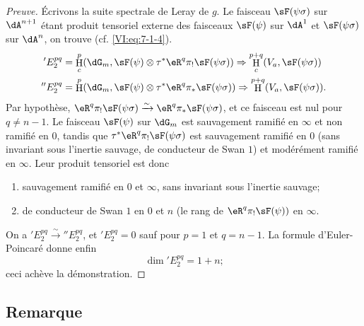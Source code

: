 \documentclass[oneside]{book}
\DeclareMathOperator{\h}{H}
\newcommand{\iso}{\xrightarrow\sim}
\theoremstyle{sga-source}
\theoremstyle{sga-source-dash}
\theoremstyle{sga-source-dotdash}
\theoremstyle{sga-source-number-note-dash}
\theoremstyle{sga-source-note-number-dotdash}
\theoremstyle{sga-source-example-dotdash}
\theoremstyle{sga-source-inline-number}
\theoremstyle{sga-source-bare-number}
\theoremstyle{sga-source}
\begin{document}
\begin{proof}[Preuve]
Écrivons la suite spectrale de Leray de $g$. Le faisceau $\sF(\psi\sigma)$ sur 
$\dA^{n+1}$ étant produit tensoriel externe des faisceaux $\sF(\psi)$ sur 
$\dA^1$ et $\sF(\psi\sigma)$ sur $\dA^n$, on trouve (cf. \eqref{VI:eq:7-1-4}). 
\begin{align*}
  'E_2^{p q} &= \h_c^p(\dG_m,\sF(\psi)\otimes \tau^\ast \eR^q \pi_! \sF(\psi\sigma)) \Rightarrow \h_c^{p+q}(V_a,\sF(\psi\sigma)) \\
  ''E_2^{p q} &= \h^p(\dG_m,\sF(\psi)\otimes \tau^\ast \eR^q \pi_\ast \sF(\psi\sigma)) \Rightarrow \h^{p+q}(V_a,\sF(\psi\sigma)) \text{.} 
\end{align*}
Par hypothèse, 
$\eR^q \pi_! \sF(\psi\sigma) \iso \eR^q \pi_\ast \sF(\psi\sigma)$, et ce 
faisceau est nul pour $q\ne n-1$. Le faisceau $\sF(\psi)$ sur $\dG_m$ est 
sauvagement ramifié en $\infty$ et non ramifié en $0$, tandis que 
$\tau^\ast \eR^q \pi_! \sF(\psi\sigma)$ est sauvagement ramifié en $0$ (sans 
invariant sous l'inertie sauvage, de conducteur de Swan $1$) et modérément 
ramifié en $\infty$. Leur produit tensoriel est donc 
\begin{enumerate}[\indent a)]
  \item sauvagement ramifié en $0$ et $\infty$, sans invariant sous l'inertie 
    sauvage; 
  \item de conducteur de Swan $1$ en $0$ et $n$ (le rang de 
    $\eR^q \pi_! \sF(\psi))$ en $\infty$. 
\end{enumerate}
On a $'E_2^{p q} \iso ''E_2^{p q}$, et $'E_2^{p q}=0$ sauf pour $p=1$ et 
$q=n-1$. La formule d'Euler-Poincaré donne enfin 
\[
  \dim{'E_2^{p q}} = 1+n \text{;} 
\]
ceci achève la démonstration. 
\end{proof}





\subsection{Remarque}\label{VI:7-15}
\end{document}

